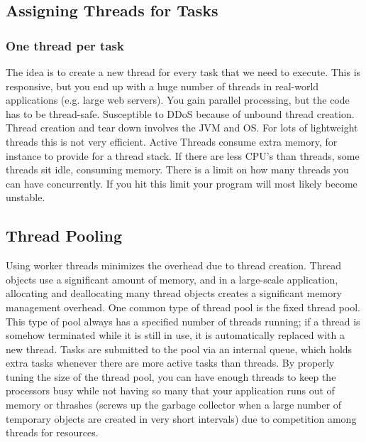 \documentclass{article}
\begin{document}
\subsection{Assigning Threads for Tasks}
\subsubsection{One thread per task}
The idea is to create a new thread for every task that we need to execute. This is responsive, but you end up with a huge number of threads in real-world applications (e.g. large web servers). You gain parallel processing, but the code has to be thread-safe. Susceptible to DDoS because of unbound thread creation. Thread creation and tear down involves the JVM and OS. For lots of lightweight threads this is not very efficient. Active Threads consume extra memory, for instance to provide for a thread stack. If there are less CPU's than threads, some threads sit idle, consuming memory. There is a limit on how many threads you can have concurrently. If you hit this limit your program will most likely become unstable.

\subsection{Thread Pooling}
Using worker threads minimizes the overhead due to thread creation. Thread objects use a significant amount of memory, and in a large-scale application, allocating and deallocating many thread objects creates a significant memory management overhead. One common type of thread pool is the fixed thread pool. This type of pool always has a specified number of threads running; if a thread is somehow terminated while it is still in use, it is automatically replaced with a new thread. Tasks are submitted to the pool via an internal queue, which holds extra tasks whenever there are more active tasks than threads. By properly tuning the size of the thread pool, you can have enough threads to keep the processors busy while not having so many that your application runs out of memory or thrashes (screws up the garbage collector when a large number of temporary objects are created in very short intervals) due to competition among threads for resources.
\end{document}
